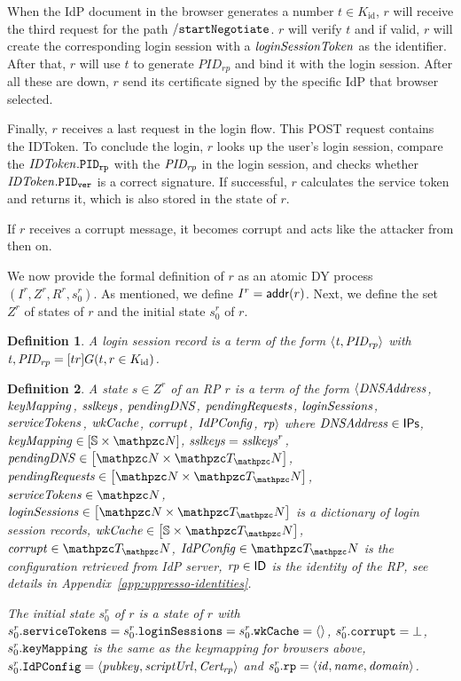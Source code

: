 \documentclass[letterpaper,onecolumn,10pt]{article}
\newtheorem{definition}{Definition}
\begin{document}
When the IdP document in the browser generates a number $t\in K_\text{id}$,
$r$ will receive the third request for the path $\mathtt{/startNegotiate}$.
$r$ will verify $t$ and if valid, $r$ will create the corresponding 
login session with a $\mathit{loginSessionToken}$ as the identifier. After that,
$r$ will use $t$ to generate $PID_{rp}$ and bind it with the login session.
After all these are down, $r$ send its certificate signed by the specific IdP that browser selected.

Finally, $r$ receives a last request in the login flow. This POST request 
contains the IDToken. To conclude the login, $r$ looks up the user's login session, 
compare the $\mathit{IDToken}.\mathtt{PID_{rp}}$ with the $\mathit{PID_{rp}}$ in the login session, and checks 
whether $\mathit{IDToken}.\mathtt{PID_{ver}}$ is a correct signature. If successful, $r$ calculates the 
service token and returns it, which is also stored in the state of $r$.

If $r$ receives a corrupt message, it becomes corrupt and acts like
the attacker from then on.

We now provide the formal definition of $r$ as an atomic DY process
$(I^r, Z^r, R^r, s^r_0)$. As mentioned, we define $I^r =
\mathsf{addr}(r)$. Next, we define the set $Z^r$ of states of
$r$ and the initial state $s^r_0$ of $r$.

\begin{definition}
  A \emph{login session record} is a term of the form $\langle\mathit{t},
    \mathit{PID_{rp}}\rangle$ with $\mathit{t}, \mathit{PID_{rp}}=[tr]G(t,r\in K_{\text{id}})$.
\end{definition}

\begin{sloppypar}
  \begin{definition}\label{def:relying-parties}
    A \emph{state $s\in Z^r$ of an RP $r$} is a term of the form
    $\langle\mathit{DNSAddress}$, $\mathit{keyMapping}$,
    $\mathit{sslkeys}$, $\mathit{pendingDNS}$, $\mathit{pendingRequests}$,
    $\mathit{loginSessions}$, $\mathit{serviceTokens}$, $\mathit{wkCache}$,
    $\mathit{corrupt}$, $\mathit{IdPConfig}$, $\mathit{rp}\rangle$ where $\mathit{DNSAddress} \in \mathsf{IPs}$,
    $\mi{keyMapping} \in \dict{\mathbb{S}}{\nonces}$,
    $\mathit{sslkeys}=\mathit{sslkeys}^r$,
    $\mi{pendingDNS} \in \dict{\nonces}{\terms}$,
    $\mi{pendingRequests} \in \dict{\nonces}{\terms}$,
    $\mi{serviceTokens} \in \nonces$,
    $\mi{loginSessions} \in \dict{\nonces}{\terms}$ is a dictionary of
    login session records,
    $\mi{wkCache} \in \dict{\mathbb{S}}{\terms}$,
    $\mi{corrupt} \in \terms$,
    $\mi{IdPConfig} \in \terms$ is the configuration retrieved from IdP server,
    $\mathit{rp} \in \mathsf{ID}$ is the identity of the RP, see details in Appendix~\ref{app:uppresso-identities}.

    The \emph{initial state $s^r_0$ of $r$} is a state of $r$ with
    $s^r_0.\mathtt{serviceTokens} = s^r_0.\mathtt{loginSessions} =
    s^r_0.\mathtt{wkCache} = \langle\rangle$,
    $s^r_0.\mathtt{corrupt} = \bot$, $s^r_0.\mathtt{keyMapping}$ is the
    same as the keymapping for browsers above,
    $s^r_0.\mathtt{IdPConfig} = \langle\mathit{pubkey},\mathit{scriptUrl},\mathit{Cert_{rp}}\rangle$ and
    $s^r_0.\mathtt{rp} = \langle\mathit{id},\mathit{name},\mathit{domain}\rangle$.
  \end{definition}
\end{sloppypar}
\end{document}
